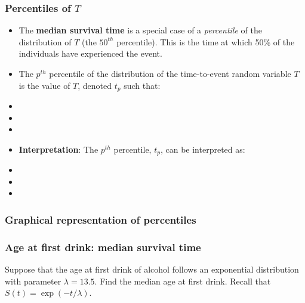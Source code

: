 \begin{frame}
\frametitle{Percentiles of $T$}
\begin{itemize}
\item The \textbf{median survival time} is a special case of a \textit{percentile} of the distribution of $T$ (the $50^{th}$ percentile).  This is the time at which 50\% of the individuals have experienced the event.
\item The $p^{th}$ percentile of the distribution of the time-to-event random variable $T$ is the value of $T$, denoted $t_p$ such that:
\item[]
\item[]
\item[]


\item \textbf{Interpretation}: The $p^{th}$ percentile, $t_p$, can be interpreted as:
\item[] %
\item[] %
\item[] %
\end{itemize}
\end{frame}

\begin{frame}
\frametitle{Graphical representation of percentiles}
\end{frame}

\begin{frame}
\frametitle{Age at first drink: median survival time}
Suppose that the age at first drink of alcohol follows an exponential distribution with parameter $\lambda=13.5$. Find the median age at first drink.  Recall that $S(t)=\exp(-t/\lambda)$.
\vskip150pt
\end{frame}

